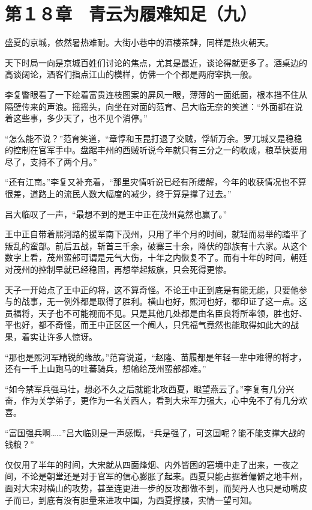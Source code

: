 \section{第１８章　青云为履难知足（九）}

盛夏的京城，依然暑热难耐。大街小巷中的酒楼茶肆，同样是热火朝天。

天下时局一向是京城百姓们讨论的焦点，尤其是最近，谈论得就更多了。酒桌边的高谈阔论，酒客们指点江山的模样，仿佛一个个都是两府宰执一般。

李复瞥眼看了一下绘着富贵连枝图案的屏风一眼，薄薄的一面纸面，根本挡不住从隔壁传来的声浪。摇摇头，向坐在对面的范育、吕大临无奈的笑道：“外面都在说着这些事，多少天了，也不见个消停。”

“怎么能不说？”范育笑道，“章惇和玉昆打退了交贼，俘斩万余。罗兀城又是稳稳的控制在官军手中。盘踞丰州的西贼听说今年就只有三分之一的收成，粮草快要用尽了，支持不了两个月。”

“还有江南。”李复又补充着，“那里灾情听说已经有所缓解，今年的收获情况也不算很差，道路上的流民人数大幅度的减少，终于算是撑了过去。”

吕大临叹了一声，“最想不到的是王中正在茂州竟然也赢了。”

王中正自带着熙河路的援军南下茂州，只用了半个月的时间，就轻而易举的踏平了叛乱的蛮部。前后五战，斩首三千余，破寨三十余，降伏的部族有十六家。从这个数字上看，茂州蛮部可谓是元气大伤，十年之内恢复不了。而有十年的时间，朝廷对茂州的控制早就已经稳固，再想举起叛旗，只会死得更惨。

天子一开始点了王中正的将，这不算奇怪。不论王中正到底是有能无能，只要他参与的战事，无一例外都是取得了胜利。横山也好，熙河也好，都印证了这一点。这员福将，天子也不可能视而不见。只是其他几处都是由名臣良将所率领，胜也好、平也好，都不奇怪，而王中正区区一个阉人，只凭福气竟然也能取得如此大的战果，着实让许多人惊讶。

“那也是熙河军精锐的缘故。”范育说道，“赵隆、苗履都是年轻一辈中难得的将才，还有一千上山跑马的吐蕃骑兵，想输给茂州蛮部都难。”

“如今禁军兵强马壮，想必不久之后就能北攻西夏，眼望燕云了。”李复有几分兴奋，作为关学弟子，更作为一名关西人，看到大宋军力强大，心中免不了有几分欢喜。

“富国强兵啊……”吕大临则是一声感慨，“兵是强了，可这国呢？能不能支撑大战的钱粮？”

仅仅用了半年的时间，大宋就从四面烽烟、内外皆困的窘境中走了出来，一夜之间，不论是朝堂还是对于官军的信心膨胀了起来。西夏只能占据着偏僻之地丰州，面对大宋对横山的攻势，甚至连更进一步的反攻都做不到，而契丹人也只是动嘴皮子而已，到底有没有胆量来进攻中国，为西夏撑腰，实情一望可知。

